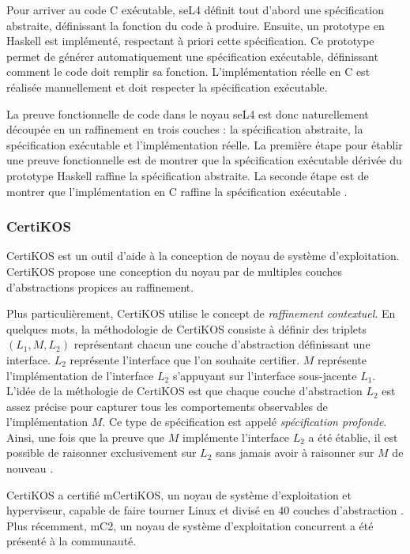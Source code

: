 	Pour arriver au code C exécutable, seL4 définit tout d'abord une spécification abstraite, définissant la fonction du code à produire. Ensuite, un prototype en Haskell est implémenté, respectant à priori cette spécification. Ce prototype permet de générer automatiquement une spécification exécutable, définissant comment le code doit remplir sa fonction. L'implémentation réelle en C est réalisée manuellement et doit respecter la spécification exécutable.

	La preuve fonctionnelle de code dans le noyau seL4 est donc naturellement découpée en un raffinement en trois couches : la spécification abstraite, la spécification exécutable et l'implémentation réelle. La première étape pour établir une preuve fonctionnelle est de montrer que la spécification exécutable dérivée du prototype Haskell raffine la spécification abstraite. La seconde étape est de montrer que l'implémentation en C raffine la spécification exécutable \cite{sel4}.

			\subsubsection{CertiKOS}

	CertiKOS \cite{certikoswebsite} est un outil d'aide à la conception de noyau de système d'exploitation. CertiKOS propose une conception du noyau par de multiples couches d'abstractions propices au raffinement.

	Plus particulièrement, CertiKOS utilise le concept de \emph{raffinement contextuel}. En quelques mots, la méthodologie de CertiKOS consiste à définir des triplets $(L_1, M, L_2)$ représentant chacun une couche d'abstraction définissant une interface. $L_2$ représente l'interface que l'on souhaite certifier. $M$ représente l'implémentation de l'interface $L_2$ s'appuyant sur l'interface sous-jacente $L_1$. L'idée de la méthologie de CertiKOS est que chaque couche d'abstraction $L_2$ est assez précise pour capturer tous les comportements observables de l'implémentation $M$. Ce type de spécification est appelé \emph{spécification profonde}. Ainsi, une fois que la preuve que $M$ implémente l'interface $L_2$ a été établie, il est possible de raisonner exclusivement sur $L_2$ sans jamais avoir à raisonner sur $M$ de nouveau \cite{gu2015deep}.

	CertiKOS a certifié mCertiKOS, un noyau de système d'exploitation et hyperviseur, capable de faire tourner Linux et divisé en 40 couches d'abstraction \cite{gu2011certikos}. Plus récemment, mC2, un noyau de système d'exploitation concurrent \cite{concurrentcertikos, gu2016certikos} a été présenté à la communauté.

